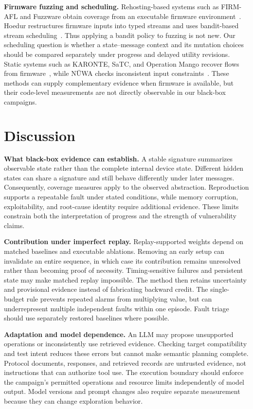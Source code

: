 \documentclass[10pt,journal,compsoc]{IEEEtran}
\newcommand{\parab}[1]{\vspace{0.04in}\noindent\textbf{#1}}
\begin{document}
\parab{Firmware fuzzing and scheduling.}
Rehosting-based systems such as FIRM-AFL and Fuzzware obtain coverage from an executable firmware environment~\cite{firmafl,fuzzware}. Hoedur restructures firmware inputs into typed streams and uses bandit-based stream scheduling~\cite{hoedur}. Thus applying a bandit policy to fuzzing is not new. Our scheduling question is whether a state--message context and its mutation choices should be compared separately under progress and delayed utility revisions. Static systems such as KARONTE, SaTC, and Operation Mango recover flows from firmware~\cite{karonte,satc,mango}, while N\"{U}WA checks inconsistent input constraints~\cite{nuwa}. These methods can supply complementary evidence when firmware is available, but their code-level measurements are not directly observable in our black-box campaigns.

\section{Discussion}\label{sec:discussion}
\parab{What black-box evidence can establish.}
A stable signature summarizes observable state rather than the complete internal device state. Different hidden states can share a signature and still behave differently under later messages. Consequently, coverage measures apply to the observed abstraction. Reproduction supports a repeatable fault under stated conditions, while memory corruption, exploitability, and root-cause identity require additional evidence. These limits constrain both the interpretation of progress and the strength of vulnerability claims.

\parab{Contribution under imperfect replay.}
Replay-supported weights depend on matched baselines and executable ablations. Removing an early setup can invalidate an entire sequence, in which case its contribution remains unresolved rather than becoming proof of necessity. Timing-sensitive failures and persistent state may make matched replay impossible. The method then retains uncertainty and provisional evidence instead of fabricating backward credit. The single-budget rule prevents repeated alarms from multiplying value, but can underrepresent multiple independent faults within one episode. Fault triage should use separately restored baselines where possible.

\parab{Adaptation and model dependence.}
An LLM may propose unsupported operations or inconsistently use retrieved evidence. Checking target compatibility and test intent reduces these errors but cannot make semantic planning complete. Protocol documents, responses, and retrieved records are untrusted evidence, not instructions that can authorize tool use. The execution boundary should enforce the campaign's permitted operations and resource limits independently of model output. Model versions and prompt changes also require separate measurement because they can change exploration behavior.
\end{document}
